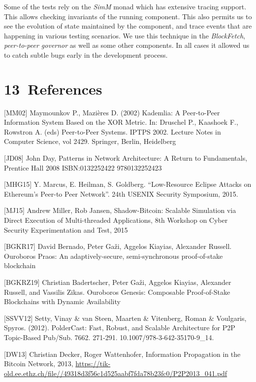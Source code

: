 \documentclass[11pt,a4paper]{article}
\begin{document}
Some of the tests rely on the \emph{SimM} monad which has extensive
tracing support. This allows checking invariants of the running
component. This also permits us to see the evolution of state maintained
by the component, and trace events that are happening in various testing
scenarios. We use this technique in the \emph{BlockFetch},
\emph{peer-to-peer governor} as well as some other components. In all
cases it allowed us to catch subtle bugs early in the development
process.

\hypertarget{references}{%
\section{​13​~References}\label{references}}

{[}MM02{]} Maymounkov P., Mazières D. (2002) Kademlia: A Peer-to-Peer
Information System Based on the XOR Metric. In: Druschel P., Kaashoek
F., Rowstron A. (eds) Peer-to-Peer Systems. IPTPS 2002. Lecture Notes in
Computer Science, vol 2429. Springer, Berlin, Heidelberg

{[}JD08{]} John Day, Patterns in Network Architecture: A Return to
Fundamentals, Prentice Hall 2008 ISBN:0132252422 9780132252423

{[}MHG15{]} Y. Marcus, E. Heilman, S. Goldberg. ``Low-Resource Eclipse
Attacks on Ethereum's Peer-to Peer Network''. 24th USENIX Security
Symposium, 2015.

{[}MJ15{]} Andrew Miller, Rob Jansen, Shadow-Bitcoin: Scalable
Simulation via Direct Execution of Multi-threaded Applications, 8th
Workshop on Cyber Security Experimentation and Test, 2015

{[}BGKR17{]} David Bernado, Peter Gaži, Aggelos Kiayias, Alexander
Russell. Ouroboros Praos: An adaptively-secure, semi-synchronous
proof-of-stake blockchain

{[}BGKRZ19{]} Christian Badertscher, Peter Gaži, Aggelos Kiayias,
Alexander Russell, and Vassilis Zikas. Ouroboros Genesis: Composable
Proof-of-Stake Blockchains with Dynamic Availability

{[}SSVV12{]} Setty, Vinay \& van Steen, Maarten \& Vitenberg, Roman \&
Voulgaris, Spyros. (2012). PolderCast: Fast, Robust, and Scalable
Architecture for P2P Topic-Based Pub/Sub. 7662. 271-291.
10.1007/978-3-642-35170-9\_14.

{[}DW13{]} Christian Decker, Roger Wattenhofer, Information Propagation
in the Bitcoin Network, 2013,
\href{https://tik-old.ee.ethz.ch/file//49318d3f56c1d525aabf7fda78b23fc0/P2P2013_041.pdf}{{https://tik-old.ee.ethz.ch/file//49318d3f56c1d525aabf7fda78b23fc0/P2P2013\_041.pdf}}
\end{document}
